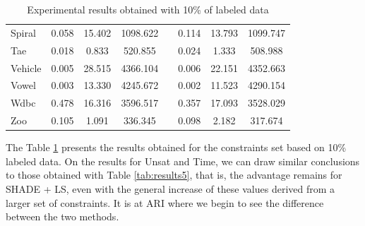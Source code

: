 \documentclass[review]{elsarticle}
\begin{document}
\begin{table}[!h]
{\begin{tabular}{l ccc c ccc}
			Spiral & 0.058 & 15.402 & 1098.622 && 0.114 & 13.793 & 1099.747 \\
			Tae & 0.018 & 0.833 & 520.855 && 0.024 & 1.333 & 508.988 \\
			Vehicle & 0.005 & 28.515 & 4366.104 && 0.006 & 22.151 & 4352.663 \\
			Vowel & 0.003 & 13.330 & 4245.672 && 0.002 & 11.523 & 4290.154 \\
			Wdbc & 0.478 & 16.316 & 3596.517 && 0.357 & 17.093 & 3528.029 \\
			Zoo & 0.105 & 1.091 & 336.345 && 0.098 & 2.182 & 317.674 \\
			\hline
			
		\end{tabular}}
		
	\caption{Experimental results obtained with 10\% of labeled data}
	\label{tab:results:10}
\end{table}

The Table \ref{tab:results:10} presents the results obtained for the constraints set based on 10\% labeled data. On the results for Unsat and Time, we can draw similar conclusions to those obtained with Table \ref{tab:results5}, that is, the advantage remains for SHADE + LS, even with the general increase of these values derived from a larger set of constraints. It is at ARI where we begin to see the difference between the two methods.
	
\end{document}
